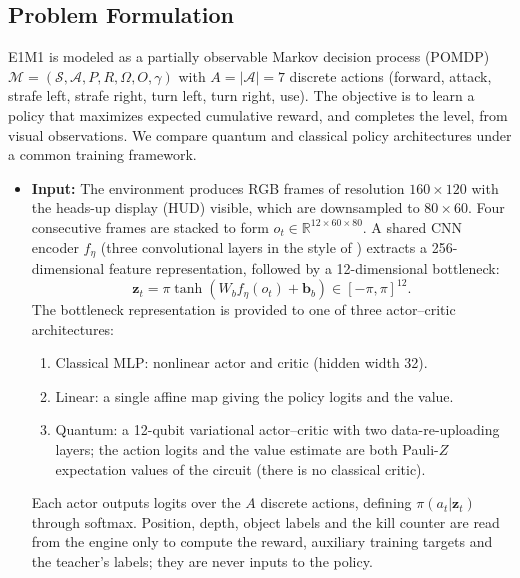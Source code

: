 \documentclass[10pt, a4paper]{article}
\begin{document}
\subsection{Problem Formulation}

E1M1 is modeled as a partially
observable Markov decision process (POMDP)
$\mathcal{M}=(\mathcal{S},\mathcal{A},P,R,\Omega,O,\gamma)$
with $A=|\mathcal{A}|=7$ discrete actions (forward, attack, strafe left, strafe right, turn left, turn right, use).
The objective is to learn a policy that maximizes
expected cumulative reward, and completes the level, from visual observations.
We compare quantum and classical policy architectures
under a common training framework.

\begin{itemize}
    \item \textbf{Input:}
    The environment produces RGB frames of resolution
    $160\times120$ with the heads-up display (HUD) visible, which are downsampled to $80\times60$.
    Four consecutive frames are stacked to form
    $o_t\in\mathbb{R}^{12\times60\times80}$.
    A shared CNN encoder $f_{\eta}$ (three convolutional layers in the style of \cite{mnih_dqn_2015}) extracts a
    256-dimensional feature representation, followed
    by a 12-dimensional bottleneck:
    \begin{equation}
        \mathbf{z}_t =
        \pi\tanh(W_b f_{\eta}(o_t)+\mathbf{b}_b)
        \in[-\pi,\pi]^{12}.
    \end{equation}
    The bottleneck representation is provided to one
    of three actor--critic architectures:
    \begin{enumerate}
        \item Classical MLP: nonlinear actor and critic (hidden width 32).
        \item Linear: a single affine map giving the policy logits and the value.
        \item Quantum: a 12-qubit variational actor--critic
        with two data-re-uploading layers; the action logits and the value
        estimate are both Pauli-$Z$ expectation values of the circuit (there is no classical critic).
    \end{enumerate}
    Each actor outputs logits over the $A$ discrete actions, defining
    $\pi(a_t|\mathbf{z}_t)$ through softmax.
    Position, depth, object labels and the kill counter are read from the engine only to compute
    the reward, auxiliary training targets and the teacher's labels; they are never inputs to the policy.


\end{itemize}
\end{document}
